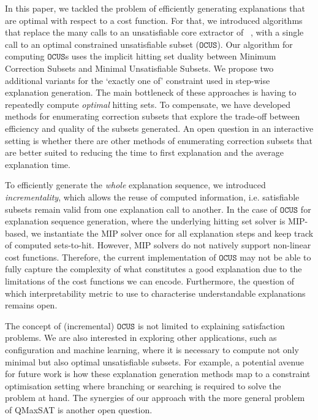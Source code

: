 \documentclass[twoside,11pt]{article}
\newcommand\citet[1]{\citeauthor{#1}~\citeyear{#1}}
\newcommand\mm[1]{\ensuremath{#1}\xspace}
\newcommand\call[1]{\mm{\texttt{#1}}}
\newcommand\comus{\mm{\call{OCUS}}}
\begin{document}
In this paper, we tackled the problem of efficiently generating explanations that are optimal with respect to a cost function.
For that, we introduced algorithms that replace the many calls to an unsatisfiable core extractor of \citet{bogaerts2021framework}, with a single call to an optimal constrained unsatisfiable subset (\comus).
Our algorithm for computing \comus{}s uses the implicit hitting set duality between Minimum Correction Subsets and Minimal Unsatisfiable Subsets. 
We propose two additional variants for the `exactly one of' constraint used in step-wise explanation generation.
The main bottleneck of these approaches is having to repeatedly compute \emph{optimal} hitting sets.
To compensate, we have developed methods for enumerating correction subsets that explore the trade-off between efficiency and quality of the subsets generated.
An open question in an interactive setting is whether there are other methods of enumerating correction subsets that are better suited to reducing the time to first explanation and the average explanation time.

To efficiently generate the \emph{whole} explanation sequence, we introduced \emph{incrementality}, which allows the reuse of computed information, i.e. satisfiable subsets remain valid from one explanation call to another.
In the case of \comus for explanation sequence generation, where the underlying hitting set solver is MIP-based, we instantiate the MIP solver once for all explanation steps and keep track of computed sets-to-hit.
However, MIP solvers do not natively support non-linear cost functions. 
Therefore, the current implementation of \comus may not be able to fully capture the complexity of what constitutes a good explanation due to the limitations of the cost functions we can encode.
Furthermore, the question of which interpretability metric to use to characterise understandable explanations remains open.  

The concept of (incremental) \comus is not limited to explaining satisfaction problems. We are also interested in exploring other applications, such as configuration and machine learning, where it is necessary to compute not only minimal but also optimal unsatisfiable subsets.
For example, a potential avenue for future work is how these explanation generation methods map to a constraint optimisation setting where branching or searching is required to solve the problem at hand. 
The synergies of our approach with the more general problem of QMaxSAT \cite{DBLP:journals/constraints/IgnatievJM16} is another open question. 
\end{document}

